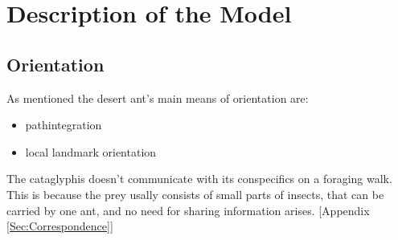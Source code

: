 \documentclass[11pt]{article}
\begin{document}
\section{Description of the Model}
\subsection{Orientation}
As mentioned the desert ant's main means of orientation are:
\begin{itemize}
\item pathintegration
\item local landmark orientation
\end{itemize}
The cataglyphis doesn't communicate with its conspecifics on a foraging walk.
This is because the prey usally consists of small parts of insects, that can be carried by one ant, and no need for sharing information arises. [Appendix \ref{Sec:Correspondence}]
\end{document}
